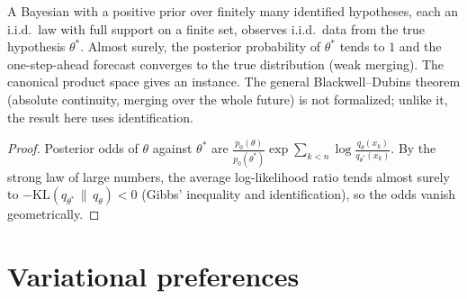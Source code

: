 \begin{theorem}
\label{thm:beh-bayes-consistency}
\leanok
A Bayesian with a positive prior over finitely many identified hypotheses, each an i.i.d.\ law with full support on
a finite set, observes i.i.d.\ data from the true hypothesis $\theta^*$. Almost surely, the posterior probability of
$\theta^*$ tends to $1$ and the one-step-ahead forecast converges to the true distribution (weak merging). The canonical product space
gives an instance. The general Blackwell--Dubins theorem (absolute continuity, merging over the whole future) is not
formalized; unlike it, the result here uses identification.
\end{theorem}
\begin{proof}
\leanok
Posterior odds of $\theta$ against $\theta^*$ are $\frac{p_0(\theta)}{p_0(\theta^*)}\exp\sum_{k<n}\log\frac{q_\theta(x_k)}{q_{\theta^*}(x_k)}$.
By the strong law of large numbers, the average log-likelihood ratio tends almost surely to
$-\mathrm{KL}(q_{\theta^*}\,\|\,q_\theta)<0$ (Gibbs' inequality and identification), so the odds vanish
geometrically.
\end{proof}

\section{Variational preferences}


